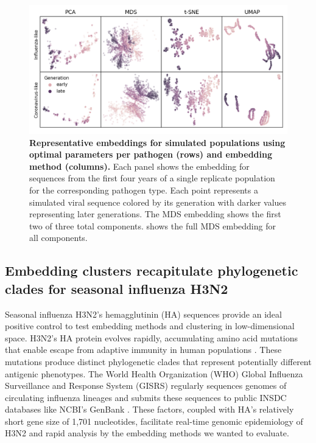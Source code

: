 \documentclass[10pt,letterpaper]{article}
\begin{document}
\begin{figure}[!h]
\includegraphics[width=\columnwidth]{figures/simulated-populations-representative-embeddings.png}
\caption{{\bf Representative embeddings for simulated populations using optimal parameters per pathogen (rows) and embedding method (columns).}
  Each panel shows the embedding for sequences from the first four years of a single replicate population for the corresponding pathogen type.
  Each point represents a simulated viral sequence colored by its generation with darker values representing later generations.
  The MDS embedding shows the first two of three total components.
   shows the full MDS embedding for all components.}
\label{fig:simulated-populations-representative-embeddings}
\end{figure}

\subsection*{Embedding clusters recapitulate phylogenetic clades for seasonal influenza H3N2}

Seasonal influenza H3N2's hemagglutinin (HA) sequences provide an ideal positive control to test embedding methods and clustering in low-dimensional space.
H3N2's HA protein evolves rapidly, accumulating amino acid mutations that enable escape from adaptive immunity in human populations \cite{Petrova2018}.
These mutations produce distinct phylogenetic clades that represent potentially different antigenic phenotypes.
The World Health Organization (WHO) Global Influenza Surveillance and Response System (GISRS) regularly sequences genomes of circulating influenza lineages \cite{Hay2018} and submits these sequences to public INSDC databases like NCBI's GenBank \cite{Arita2021}.
These factors, coupled with HA's relatively short gene size of 1,701 nucleotides, facilitate real-time genomic epidemiology of H3N2 \cite{Neher2015} and rapid analysis by the embedding methods we wanted to evaluate.
\end{document}
